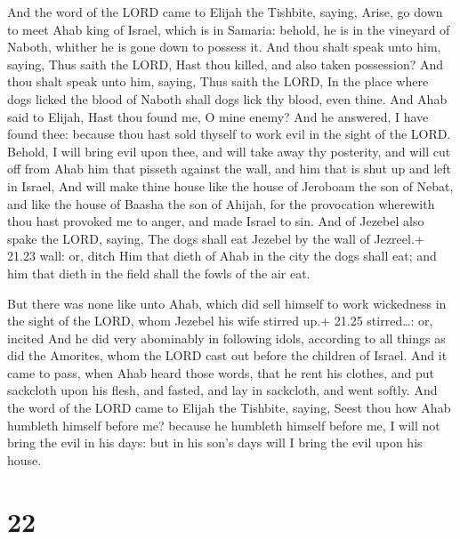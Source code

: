  And the word of the LORD came to Elijah the Tishbite,
saying,  Arise, go down to meet Ahab king of Israel, which
is in Samaria: behold, he is in the vineyard of Naboth, whither he is
gone down to possess it.  And thou shalt speak unto him,
saying, Thus saith the LORD, Hast thou killed, and also taken
possession? And thou shalt speak unto him, saying, Thus saith the LORD,
In the place where dogs licked the blood of Naboth shall dogs lick thy
blood, even thine.  And Ahab said to Elijah, Hast thou
found me, O mine enemy? And he answered, I have found thee: because thou
hast sold thyself to work evil in the sight of the LORD. 
Behold, I will bring evil upon thee, and will take away thy posterity,
and will cut off from Ahab him that pisseth against the wall, and him
that is shut up and left in Israel,  And will make thine
house like the house of Jeroboam the son of Nebat, and like the house of
Baasha the son of Ahijah, for the provocation wherewith thou hast
provoked me to anger, and made Israel to sin.  And of
Jezebel also spake the LORD, saying, The dogs shall eat Jezebel by the
wall of Jezreel.+ 21.23 wall: or, ditch  Him that dieth of
Ahab in the city the dogs shall eat; and him that dieth in the field
shall the fowls of the air eat.

 But there was none like unto Ahab, which did sell
himself to work wickedness in the sight of the LORD, whom Jezebel his
wife stirred up.+ 21.25 stirred\ldots: or, incited  And he
did very abominably in following idols, according to all things as did
the Amorites, whom the LORD cast out before the children of Israel.
 And it came to pass, when Ahab heard those words, that he
rent his clothes, and put sackcloth upon his flesh, and fasted, and lay
in sackcloth, and went softly.  And the word of the LORD
came to Elijah the Tishbite, saying,  Seest thou how Ahab
humbleth himself before me? because he humbleth himself before me, I
will not bring the evil in his days: but in his son's days will I bring
the evil upon his house.

\hypertarget{section-21}{%
\section{22}\label{section-21}}

